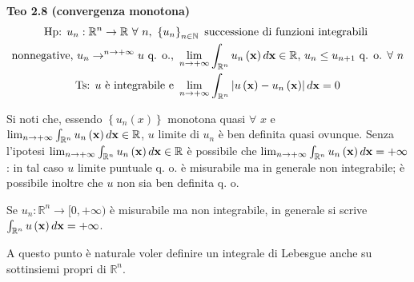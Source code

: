 \documentclass{article}
\begin{document}
\textbf{Teo 2.8 (convergenza monotona)} 
\begin{gather*}
\text{Hp: }u_{n}:%
\mathbb{R}
^{n}\rightarrow 
\mathbb{R}
\text{ }\forall \text{ }n\text{, }\left\{ u_{n}\right\} _{n\in 
\mathbb{N}
}\text{ successione di funzioni integrabili } \\
\text{nonnegative, }u_{n}\rightarrow ^{n\rightarrow +\infty }u\text{ q. o., }%
\lim_{n\rightarrow +\infty }\int_{%
\mathbb{R}
^{n}}u_{n}\left( \mathbf{x}\right) d\mathbf{x}\in 
\mathbb{R}
\text{, }u_{n}\leq u_{n+1}\text{ q. o. }\forall \text{ }n \\
\text{Ts: }u\text{ \`{e} integrabile e }\lim_{n\rightarrow +\infty }\int_{%
\mathbb{R}
^{n}}\left\vert u\left( \mathbf{x}\right) -u_{n}\left( \mathbf{x}\right)
\right\vert d\mathbf{x}=0
\end{gather*}

Si noti che, essendo $\left\{ u_{n}\left( x\right) \right\} $ monotona quasi 
$\forall $ $x$ e $\lim_{n\rightarrow +\infty }\int_{%
\mathbb{R}
^{n}}u_{n}\left( \mathbf{x}\right) d\mathbf{x}\in 
\mathbb{R}
$, $u$ limite di $u_{n}$ \`{e} ben definita quasi ovunque. Senza l'ipotesi $%
\lim_{n\rightarrow +\infty }\int_{%
\mathbb{R}
^{n}}u_{n}\left( \mathbf{x}\right) d\mathbf{x}\in 
\mathbb{R}
$ \`{e} possibile che $\lim_{n\rightarrow +\infty }\int_{%
\mathbb{R}
^{n}}u_{n}\left( \mathbf{x}\right) d\mathbf{x}=+\infty $: in tal caso $u$
limite puntuale q. o. \`{e} misurabile ma in generale non integrabile; \`{e}
possibile inoltre che $u$ non sia ben definita q. o.

Se $u_{n}:%
\mathbb{R}
^{n}\rightarrow \lbrack 0,+\infty )$ \`{e} misurabile ma non integrabile, in
generale si scrive $\int_{%
\mathbb{R}
^{n}}u\left( \mathbf{x}\right) d\mathbf{x}=+\infty $.

A questo punto \`{e} naturale voler definire un integrale di Lebesgue anche
su sottinsiemi propri di $%
\mathbb{R}
^{n}$.
\end{document}
